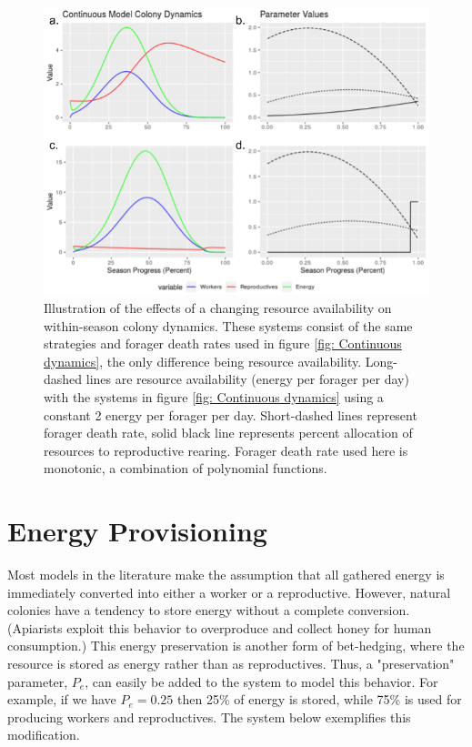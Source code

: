 \documentclass[12pt]{report}
\begin{document}
\begin{figure}[t!]
\centering
    \includegraphics[width=\textwidth]{continuousall2.png}
    \caption{Illustration of the effects of a changing resource availability on within-season colony dynamics. These systems consist of the same strategies and forager death rates used in figure \ref{fig: Continuous dynamics}, the only difference being resource availability. Long-dashed lines are resource availability (energy per forager per day) with the systems in figure \ref{fig: Continuous dynamics} using a constant 2 energy per forager per day. Short-dashed lines represent forager death rate, solid black line represents percent allocation of resources to reproductive rearing. Forager death rate used here is monotonic, a combination of polynomial functions.}
    \label{fig: Continuous dynamics 2}
\end{figure}


\section*{Energy Provisioning}
Most models in the literature make the assumption that all gathered energy is immediately converted into either a worker or a reproductive. However, natural colonies have a tendency to store energy without a complete conversion. (Apiarists exploit this behavior to overproduce and collect honey for human consumption.) This energy preservation is another form of bet-hedging, where the resource is stored as energy rather than as reproductives. Thus, a "preservation" parameter, $P_e$, can easily be added to the system to model this behavior. For example, if we have $P_e=0.25$ then 25\% of energy is stored, while 75\% is used for producing workers and reproductives. The system below exemplifies this modification.
\end{document}
